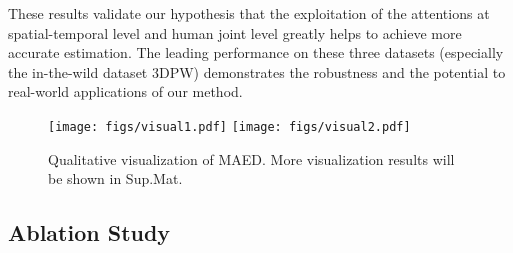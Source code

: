 \documentclass[10pt,twocolumn,letterpaper]{article}
\begin{document}
{{These results validate our hypothesis that the exploitation of the attentions at spatial-temporal level and human joint level greatly helps to achieve more accurate estimation. The leading performance on these three datasets (especially the in-the-wild dataset 3DPW) demonstrates the robustness and the potential to real-world applications of our method.









\begin{figure*}
\centering     \subfigure
{\texttt{[image: figs/visual1.pdf]}}
\subfigure
{\texttt{[image: figs/visual2.pdf]}}
\vspace{-0.1in}
\caption{Qualitative visualization of MAED. More visualization results will be shown in Sup.Mat. }
\label{fig:visual}
\end{figure*}

\subsection{Ablation Study} \label{ablation}



}}
\end{document}
